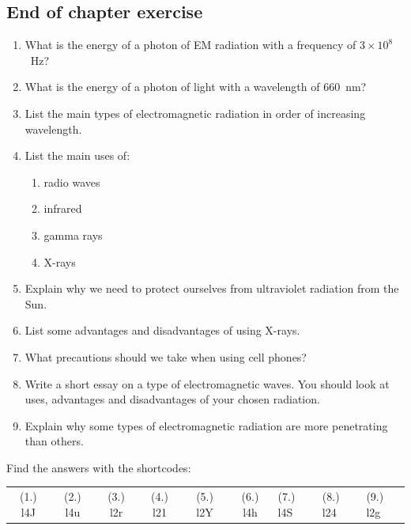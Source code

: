             \subsection{ End of chapter exercise}
            \nopagebreak
      \label{m38779*id189872}\begin{enumerate}[noitemsep, label=\textbf{\arabic*}. ] 
            \label{m38779*uid34}\item What is the energy of a photon of EM radiation with a frequency of $3\ensuremath{\times}{10}^{8}$~Hz?\newline
\label{m38779*uid35}\item What is the energy of a photon of light with a wavelength of 660~nm?\newline
\label{m38779*uid36}\item List the main types of electromagnetic radiation in order of increasing wavelength.\newline
\label{m38779*uid37}\item List the main uses of:
\label{m38779*id189946}\begin{enumerate}[noitemsep, label=\textbf{\alph*}. ] 
            \label{m38779*uid38}\item radio waves
\label{m38779*uid39}\item infrared
\label{m38779*uid40}\item gamma rays
\label{m38779*uid41}\item X-rays
\end{enumerate}
                \label{m38779*uid42}\item Explain why we need to protect ourselves from ultraviolet radiation from the Sun.\newline
\label{m38779*uid43}\item List some advantages and disadvantages of using X-rays.\newline
\label{m38779*uid44}\item What precautions should we take when using cell phones?\newline
\label{m38779*uid45}\item Write a short essay on a type of electromagnetic waves. You should look at uses, advantages and disadvantages of your chosen radiation.\newline
\label{m38779*uid46}\item Explain why some types of electromagnetic radiation are more penetrating than others.\newline
\end{enumerate}
  \label{m38779**end}
  \label{459e2bef85baf867f5850bc8338cad3a**end}
\par {} Find the answers with the shortcodes:
 \par \begin{tabular}[h]{cccccc}
 (1.) l4J  &  (2.) l4u  &  (3.) l2r  &  (4.) l21  &  (5.) l2Y  &  (6.) l4h  &  (7.) l4S  &  (8.) l24  &  (9.) l2g  & \end{tabular}
